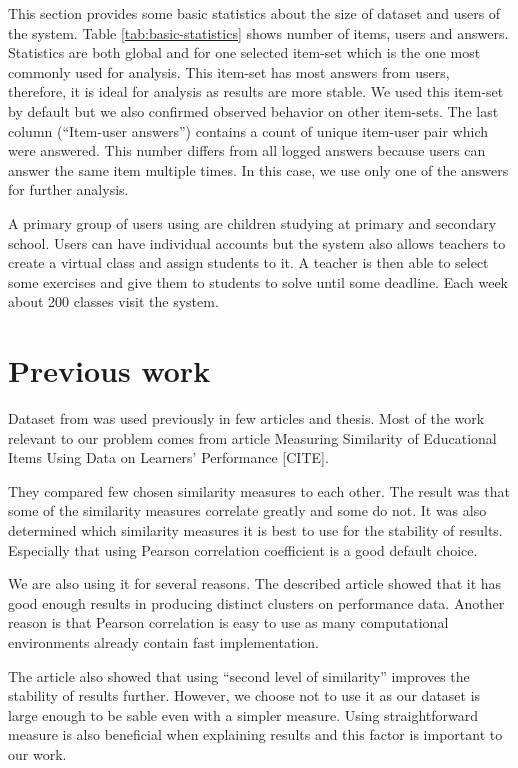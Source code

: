 \documentclass[
  digital, %
  table,   %
  nolof,     %
  nolot,     %
  nocover,
  color
]{fithesis3}
\begin{document}
This section provides some basic statistics about the size of dataset and users of the system. Table \ref{tab:basic-statistics} shows number of items, users and answers. Statistics are both global and for one selected item-set which is the one most commonly used for analysis. This item-set has most answers from users, therefore, it is ideal for analysis as results are more stable. We used this item-set by default but we also confirmed observed behavior on other item-sets. The last column (``Item-user answers'') contains a count of unique item-user pair which were answered. This number differs from all logged answers because users can answer the same item multiple times. In this case, we use only one of the answers for further analysis.


A primary group of users using \umimeCesky{} are children studying at primary and secondary school. Users can have individual accounts
but the system also allows teachers to create a virtual class and assign students to it. A teacher is then able to select some exercises and give them to students to solve until some deadline. Each week about 200 classes visit the system.


\section{Previous work}\label{previous-work}

Dataset from \umimeCesky{} was used previously in few articles and thesis. Most of the work relevant to our problem comes from article Measuring Similarity of Educational Items Using Data on Learners’ Performance [CITE].

They compared few chosen similarity measures to each other. The result was that some of the similarity measures correlate greatly and some do not. It was also determined which similarity measures it is best to use for the stability of results. Especially that using Pearson correlation coefficient is a good default choice.

We are also using it for several reasons. The described article showed that it has good enough results in producing distinct clusters on performance data. Another reason is that Pearson correlation is easy to use as many computational environments already contain fast implementation.

The article also showed that using ``second level of similarity'' improves the stability of results further. However, we choose not to use it as our dataset is large enough to be sable even with a simpler measure. Using straightforward measure is also beneficial when explaining results and this factor is important to our work.
\end{document}
